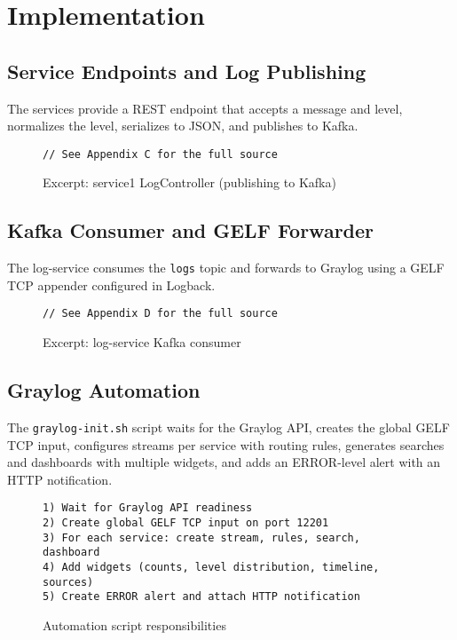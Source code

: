 \documentclass[12pt,a4paper]{report}
\begin{document}
\chapter{Implementation}
\section{Service Endpoints and Log Publishing}
The services provide a REST endpoint that accepts a message and level, normalizes the level, serializes to JSON, and publishes to Kafka.

\begin{figure}[H]
\centering
\begin{Verbatim}[frame=single, fontsize=\small, xleftmargin=1cm, xrightmargin=1cm]
// See Appendix C for the full source
\end{Verbatim}
\caption{Excerpt: service1 LogController (publishing to Kafka)}
\label{fig:logcontroller}
\end{figure}

\section{Kafka Consumer and GELF Forwarder}
The log-service consumes the \texttt{logs} topic and forwards to Graylog using a GELF TCP appender configured in Logback.

\begin{figure}[H]
\centering
\begin{Verbatim}[frame=single, fontsize=\small, xleftmargin=1cm, xrightmargin=1cm]
// See Appendix D for the full source
\end{Verbatim}
\caption{Excerpt: log-service Kafka consumer}
\label{fig:logconsumer}
\end{figure}

\section{Graylog Automation}
The \texttt{graylog-init.sh} script waits for the Graylog API, creates the global GELF TCP input, configures streams per service with routing rules, generates searches and dashboards with multiple widgets, and adds an ERROR-level alert with an HTTP notification.

\begin{figure}[H]
\centering
\begin{Verbatim}[frame=single, fontsize=\small, xleftmargin=1cm, xrightmargin=1cm]
1) Wait for Graylog API readiness
2) Create global GELF TCP input on port 12201
3) For each service: create stream, rules, search, dashboard
4) Add widgets (counts, level distribution, timeline, sources)
5) Create ERROR alert and attach HTTP notification
\end{Verbatim}
\caption{Automation script responsibilities}
\label{fig:initoverview}
\end{figure}
\end{document}

